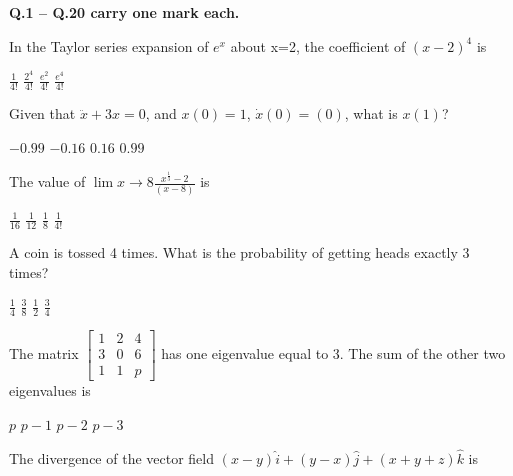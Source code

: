 \documentclass[addpoints,11pt]{exam}
\begin{document}
\large\textbf{Q.1 -- Q.20 carry one mark each.}\\
\begin{questions}

    \question In the Taylor series expansion of $e^x$ about x=2, the coefficient of $(x-2)^4$ is

    \begin{oneparchoices}
        \choice $\frac{1}{4!}$
        \choice $\frac{2^4}{4!}$
        \choice $\frac{e^2}{4!}$
        \choice $\frac{e^4}{4!}$
    \end{oneparchoices}

    \question Given that $\ddot{x} + 3x = 0$, and $x(0)=1$, $\dot{x}(0)=(0)$, what is $x(1)$?

    \begin{oneparchoices}
        \choice $-0.99$
        \choice $-0.16$
        \choice $0.16$
        \choice $0.99$
    \end{oneparchoices}

    \question The value of $\lim{x\rightarrow8} \frac{x^{\frac{1}{3}}-2}{(x-8)}$ is

    \begin{oneparchoices}
        \choice $\frac{1}{16}$
        \choice $\frac{1}{12}$
        \choice $\frac{1}{8}$
        \choice $\frac{1}{4!}$
    \end{oneparchoices}

    \question A coin is tossed 4 times. What is the probability of getting heads exactly 3 times?

    \begin{oneparchoices}
        \choice $\frac{1}{4}$
        \choice $\frac{3}{8}$
        \choice $\frac{1}{2}$
        \choice $\frac{3}{4}$
    \end{oneparchoices}

    \question The matrix $\begin{bmatrix}
            1 & 2 & 4 \\
            3 & 0 & 6 \\
            1 & 1 & p
        \end{bmatrix}$ has one eigenvalue equal to 3. The sum of the other two eigenvalues is

    \begin{oneparchoices}
        \choice $p$
        \choice $p-1$
        \choice $p-2$
        \choice $p-3$
    \end{oneparchoices}

    \question The divergence of the vector field $(x-y)\hat{i} + (y-x)\hat{j} + (x+y+z)\hat{k}$ is


\end{questions}
\end{document}
